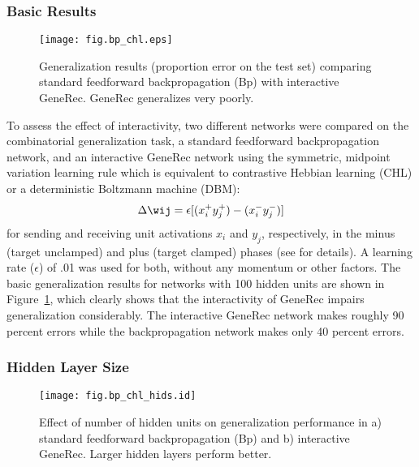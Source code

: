 \documentclass[12pt,twoside]{article}
\begin{document}
\subsubsection{Basic Results}

\begin{figure}
  \centering\texttt{[image: fig.bp\_chl.eps]}
  \caption{\small Generalization results (proportion error on the test
    set) comparing standard feedforward backpropagation (Bp) with
    interactive GeneRec.  GeneRec generalizes very poorly.}
  \label{fig.bp_chl}
\end{figure}

To assess the effect of interactivity, two different networks were
compared on the combinatorial generalization task, a standard
feedforward backpropagation network, and an interactive GeneRec
network using the symmetric, midpoint variation learning rule which is
equivalent to contrastive Hebbian learning (CHL) or a deterministic
Boltzmann machine (DBM):
\begin{equation}
  \Delta \wij = \epsilon[(x^+_i y^+_j) - (x^-_i y^-_j)]
  \label{eq.chl}
\end{equation}
for sending and receiving unit activations $x_i$ and $y_j$,
respectively, in the minus (target unclamped) and plus (target
clamped) phases (see  for details).  A learning
rate ($\epsilon$) of .01 was used for both, without any momentum or
other factors.  The basic generalization results for networks with 100
hidden units are shown in Figure~\ref{fig.bp_chl}, which clearly shows
that the interactivity of GeneRec impairs generalization considerably.
The interactive GeneRec network makes roughly 90 percent errors while
the backpropagation network makes only 40 percent errors.

\subsubsection{Hidden Layer Size}

\begin{figure}
  \centering\texttt{[image: fig.bp\_chl\_hids.id]}
  \caption{\small Effect of number of hidden units on generalization
    performance in a) standard feedforward backpropagation (Bp) and b)
    interactive GeneRec.  Larger hidden layers perform better.}
  \label{fig.bp_chl_hids}
\end{figure}
\end{document}
